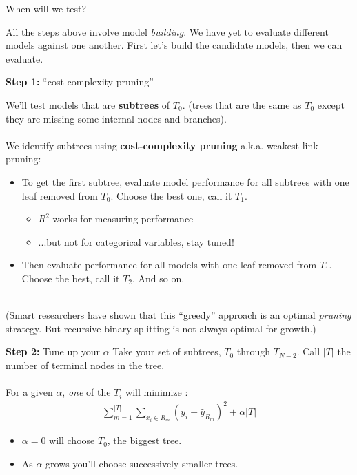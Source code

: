 \documentclass[mathserif, aspectratio=169]{beamer}
\begin{document}
\begin{frame}{When will we test?}

All the steps above involve model \textit{building}.  We have yet to evaluate different models against one another.  First let's build the candidate models, then we can evaluate.
\end{frame}

\begin{frame}{\textbf{Step 1: } ``cost complexity pruning''}

We'll test models that are \textbf{subtrees} of $T_0$. (trees that are the same as $T_0$ except they are missing some internal nodes and branches).\\~\\

We identify subtrees using \textbf{cost-complexity pruning} a.k.a. weakest link pruning:
\vspace{4mm}
\begin{itemize}
\item To get the first subtree, evaluate model performance for all subtrees with one leaf removed from $T_0$.  Choose the best one, call it $T_1$.  
\begin{itemize}
\item $R^2$ works for measuring performance
\item ...but not for categorical variables, stay tuned!
\end{itemize}
\vspace{4mm}
\item Then evaluate performance for all models with one leaf removed from $T_1$.  Choose the best, call it $T_2$.  And so on.  \\~\\
\end{itemize}

\pause

(Smart researchers have shown that this ``greedy'' approach is an optimal \textit{pruning} strategy.  But recursive binary splitting is not always optimal for growth.)

\end{frame}

\begin{frame}{\textbf{Step 2: } Tune up your $\alpha$}
Take your set of subtrees, $T_0$ through $T_{N-2}$.  Call $|T|$ the number of terminal nodes in the tree.\\~\\

For a given $\alpha$, \textit{one} of the $T_i$ will minimize :
\begin{align*}
\sum_{m=1}^{|T|} \sum_{x_i\in R_m} (y_i-\hat{y}_{R_m})^2+\alpha|T|
\end{align*}

\begin{itemize}
\item $\alpha=0$ will choose $T_0$, the biggest tree.
\item As $\alpha$ grows you'll choose successively smaller trees.  \\~\\
\end{itemize}

\end{frame}
\end{document}
